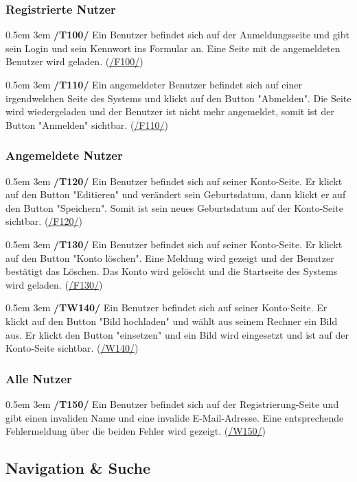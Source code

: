 \documentclass{article}
\newcommand{\specification}[3]{
	{\parindent 0.5em \hangindent 3em \hypertarget{spec:#1:#2}{\textbf{/#1#2/}} #3 \par \nobreak \vspace*{0.5em}}
}
\begin{document}
		\subsubsection{Registrierte Nutzer}
			\specification{T}{100}{Ein Benutzer befindet sich auf der Anmeldungsseite und gibt sein Login und sein Kennwort ins Formular an. Eine Seite mit de angemeldeten Benutzer wird geladen. (\hyperlink{spec:F:100}{/F100/}) }
			\specification{T}{110}{Ein angemeldeter Benutzer befindet sich auf einer irgendwelchen Seite des Systems und klickt auf den Button "Abmelden".
				Die Seite wird wiedergeladen und der Benutzer ist nicht mehr angemeldet, somit ist der Button "Anmelden" sichtbar. (\hyperlink{spec:F:110}{/F110/}) }
		\subsubsection{Angemeldete Nutzer}
			\specification{T}{120}{Ein Benutzer befindet sich auf seiner Konto-Seite. Er klickt auf den Button "Editieren" und verändert sein Geburtsdatum, dann klickt er auf den Button "Speichern". 
				Somit ist sein neues Geburtsdatum auf der Konto-Seite sichtbar. (\hyperlink{spec:F:120}{/F120/}) }
			\specification{T}{130}{Ein Benutzer befindet sich auf seiner Konto-Seite. Er klickt auf den Button "Konto löschen". Eine Meldung wird gezeigt und der Benutzer bestätigt das Löschen.
				Das Konto wird gelöscht und die Startseite des Systems wird geladen. (\hyperlink{spec:F:130}{/F130/}) }
			\specification{TW}{140}{Ein Benutzer befindet sich auf seiner Konto-Seite. Er klickt auf den Button "Bild hochladen" und wählt aus seinem Rechner ein Bild aus. 
				Er klickt den Button "einsetzen" und ein Bild wird eingesetzt und ist auf der Konto-Seite sichtbar. (\hyperlink{spec:W:140}{/W140/}) }
		\subsubsection{Alle Nutzer}
			\specification{T}{150}{Ein Benutzer befindet sich auf der Registrierung-Seite und gibt einen invaliden Name und eine invalide E-Mail-Adresse.
				Eine entsprechende Fehlermeldung über die beiden Fehler wird gezeigt. (\hyperlink{spec:W:150}{/W150/}) }
\subsection{Navigation \& Suche}
\end{document}
